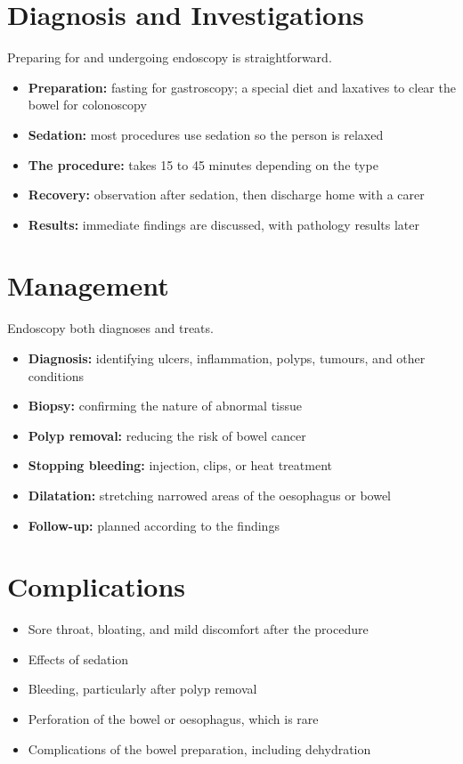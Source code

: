 \section*{Diagnosis and Investigations}
Preparing for and undergoing endoscopy is straightforward.
\begin{itemize}
    \item \textbf{Preparation:} fasting for gastroscopy; a special diet and laxatives to clear the bowel for colonoscopy
    \item \textbf{Sedation:} most procedures use sedation so the person is relaxed
    \item \textbf{The procedure:} takes 15 to 45 minutes depending on the type
    \item \textbf{Recovery:} observation after sedation, then discharge home with a carer
    \item \textbf{Results:} immediate findings are discussed, with pathology results later
\end{itemize}

\section*{Management}
Endoscopy both diagnoses and treats.
\begin{itemize}
    \item \textbf{Diagnosis:} identifying ulcers, inflammation, polyps, tumours, and other conditions
    \item \textbf{Biopsy:} confirming the nature of abnormal tissue
    \item \textbf{Polyp removal:} reducing the risk of bowel cancer
    \item \textbf{Stopping bleeding:} injection, clips, or heat treatment
    \item \textbf{Dilatation:} stretching narrowed areas of the oesophagus or bowel
    \item \textbf{Follow-up:} planned according to the findings
\end{itemize}

\section*{Complications}
\begin{itemize}
    \item Sore throat, bloating, and mild discomfort after the procedure
    \item Effects of sedation
    \item Bleeding, particularly after polyp removal
    \item Perforation of the bowel or oesophagus, which is rare
    \item Complications of the bowel preparation, including dehydration
\end{itemize}

